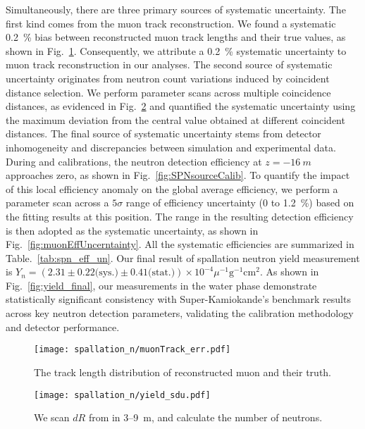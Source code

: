Simultaneously, there are three primary sources of systematic uncertainty. The first kind comes from the muon track reconstruction. We found a systematic \SI{0.2}{\%} bias between reconstructed muon track lengths and their true values, as shown in Fig.~\ref{fig:muontrackUncerntainty}. Consequently, we attribute a \SI{0.2}{\%} systematic uncertainty to muon track reconstruction in our analyses.
The second source of systematic uncertainty originates from neutron count variations induced by coincident distance selection. We perform parameter scans across multiple coincidence distances, as evidenced in Fig.~\ref{fig:muonCountUncerntainty} and quantified the systematic uncertainty using the maximum deviation from the central value obtained at different coincident distances.
The final source of systematic uncertainty stems from detector inhomogeneity and discrepancies between simulation and experimental data. During  and  calibrations, the neutron detection efficiency at $z = \SI{-16}{m}$ approaches zero, as shown in Fig.~\ref{fig:SPNsourceCalib}. To quantify the impact of this local efficiency anomaly on the global average efficiency, we perform a parameter scan across a $5\sigma$ range of efficiency uncertainty (0 to \SI{1.2}{\%}) based on the fitting results at this position. The range in the resulting detection efficiency is then adopted as the systematic uncertainty, as shown in Fig.~\ref{fig:muonEffUncerntainty}. All the systematic efficiencies are summarized in Table.~\ref{tab:spn_eff_un}. Our final result of spallation neutron yield measurement is $Y_n = (2.31\pm0.22\text{(sys.)}\pm0.41 \text{(stat.)}) \times 10^{-4}\mu^{-1}\text{g}^{-1}\text{cm}^2$. As shown in Fig.~\ref{fig:yield_final}, our measurements in the water phase demonstrate statistically significant consistency with Super-Kamiokande's benchmark results across key neutron detection parameters, validating the calibration methodology and detector performance.
\begin{figure}[h]
	\centering
	\texttt{[image: spallation\_n/muonTrack\_err.pdf]}
	\caption{The track length distribution of reconstructed muon and their truth.}
	\label{fig:muontrackUncerntainty}
\end{figure}

\begin{figure}[h]
	\centering
	\texttt{[image: spallation\_n/yield\_sdu.pdf]}
	\caption{We scan $dR$ from in 3--\SI{9}{m}, and calculate the number of neutrons.}
	\label{fig:muonCountUncerntainty}
\end{figure}

